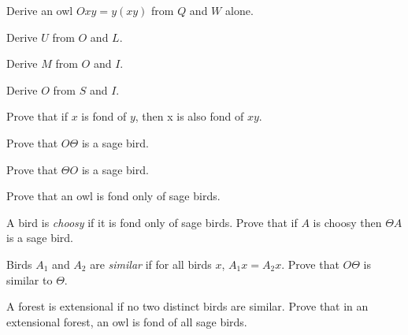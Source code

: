 \documentclass[12pt, letterpaper]{article}
\begin{document}
\begin{prob}{13.13}  
Derive an owl $Oxy = y(xy)$ from $Q$ and $W$ alone.
\end{prob}

\begin{prob}{13.14}  
Derive $U$ from $O$ and $L$.
\end{prob}

\begin{prob}{13.15}  
Derive $M$ from $O$ and $I$.
\end{prob}

\begin{prob}{13.16}  
Derive $O$ from $S$ and $I$.
\end{prob}

\begin{prob}{13.17}  
Prove that if $x$ is fond of $y$, then x is also fond of $xy$.
\end{prob}

\begin{prob}{13.18}  
Prove that $O\Theta$ is a sage bird.
\end{prob}

\begin{prob}{13.19}  
Prove that $\Theta O$ is a sage bird.
\end{prob}

\begin{prob}{13.20}  
Prove that an owl is fond only of sage birds.
\end{prob}

\begin{prob}{13.21}  
A bird is \emph{choosy} if it is fond only of sage birds. Prove that if $A$ is choosy then $\Theta A$ is a sage bird.
\end{prob}

\begin{prob}{13.22}  
Birds $A_1$ and $A_2$ are \emph{similar} if for all birds $x$, $A_1x = A_2x$. Prove that $O\Theta$ is similar to $\Theta$.
\end{prob}

\begin{prob}{13.23}  
A forest is extensional if no two distinct birds are similar. Prove that in an extensional forest, an owl is fond of all sage birds.
\end{prob}
\end{document}
